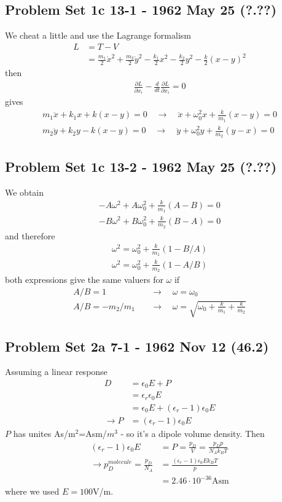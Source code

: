 \documentclass[../main.tex]{subfiles}
\begin{document}
\subsection{Problem Set 1c 13-1 - 1962 May 25 (?.??)}
We cheat a little and use the Lagrange formalism 
\begin{align}
L&=T-V\\
&=\frac{m_1}{2}\dot{x}^2+\frac{m_2}{2}\dot{y}^2-\frac{k_1}{2}x^2-\frac{k_2}{2}y^2-\frac{k}{2}(x-y)^2
\end{align}
then
\begin{align}
\frac{\partial L}{\partial x_i}-\frac{d}{dt}\frac{\partial L}{\partial\dot{x}_i}=0
\end{align}
gives
\begin{align}
m_1\ddot{x}+k_1x+k(x-y)=0\quad\rightarrow\quad \ddot{x}+\omega_0^2x+\frac{k}{m_1}(x-y)=0\\
m_2\ddot{y}+k_2y-k(x-y)=0\quad\rightarrow\quad \ddot{y}+\omega_0^2y+\frac{k}{m_2}(y-x)=0
\end{align}


\subsection{Problem Set 1c  13-2 - 1962 May 25 (?.??)}
We obtain
\begin{align}
-A\omega^2+A\omega_0^2+\frac{k}{m_1}(A-B)=0\\
-B\omega^2+B\omega_0^2+\frac{k}{m_2}(B-A)=0
\end{align}
and therefore
\begin{align}
\omega^2=\omega_0^2+\frac{k}{m_1}(1-B/A)\\
\omega^2=\omega_0^2+\frac{k}{m_2}(1-A/B)
\end{align}
both expressions give the same valuers for $\omega$ if
\begin{align}
A/B=1\quad&\rightarrow\quad \omega=\omega_0\\
A/B=-m_2/m_1\quad&\rightarrow\quad \omega=\sqrt{\omega_0+\frac{k}{m_1}+\frac{k}{m_2}}
\end{align} 

\subsection{Problem Set 2a  7-1 - 1962 Nov 12 (46.2)}
Assuming a linear response
\begin{align}
D&=\epsilon_0E+P\\
&=\epsilon_r\epsilon_0E\\
&=\epsilon_0E+(\epsilon_r-1)\epsilon_0E\\
\rightarrow P&=(\epsilon_r-1)\epsilon_0E
\end{align}
$P$ has unites As/m$^2$=Asm/$m^3$ - so it's a dipole volume density. Then
\begin{align}
(\epsilon_r-1)\epsilon_0E&=P=\frac{p_D}{V}=\frac{p_Dp}{N_Ak_BT}\\
\rightarrow p_D^{molecule}=\frac{p_D}{N_A}&=\frac{(\epsilon_r-1)\epsilon_0Ek_BT}{p}\\
&=2.46\cdot10^{-36}\text{Asm}
\end{align}
where we used $E=100$V/m.
\end{document}
